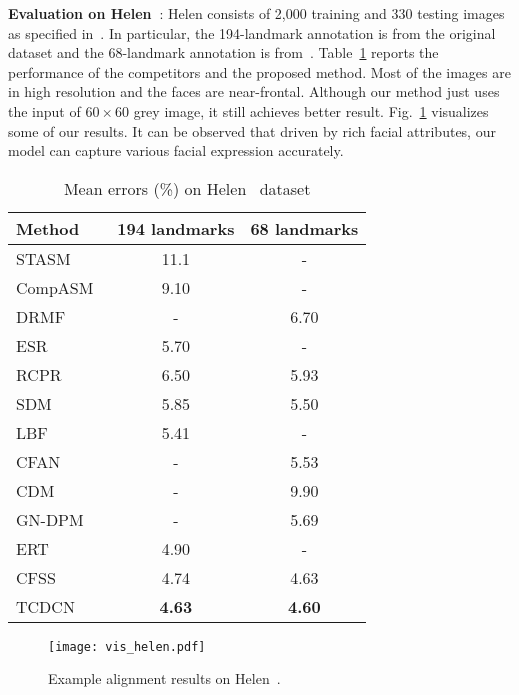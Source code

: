 \documentclass[10pt,journal,compsoc]{IEEEtran}
\begin{document}
\vspace{0.1cm}
\noindent\textbf{Evaluation on Helen~\cite{Helen}}: Helen consists of 2,000 training and 330 testing images as specified in~\cite{Helen}. In particular, the 194-landmark annotation is from the original dataset and the 68-landmark annotation is from~\cite{300w}. Table~\ref{tab:helen} reports the performance of the competitors and the proposed method. Most of the images are in high resolution and the faces are near-frontal. Although our method just uses the input of $60\times60$ grey image, it still achieves better result. Fig.~\ref{fig:visual_examples_helen} visualizes some of our results. It can be observed that driven by rich facial attributes, our model can capture various facial expression accurately.

\begin{table}[t]
\caption{Mean errors (\%) on Helen~\cite{Helen} dataset}
\vskip -0.5cm
\label{tab:helen}

\begin{center}
\begin{tabular}{l|c|c}
\hline
Method&194 landmarks&68 landmarks\\
\hline\hline
STASM~\cite{milborrow2008locating}&11.1&-\\
CompASM~\cite{Helen}&9.10&-\\
DRMF~\cite{asthana2013robust}&-&6.70\\
ESR~\cite{Cao2012}&5.70&-\\
RCPR~\cite{dollar13}&6.50&5.93\\
SDM~\cite{6618919}&5.85&5.50\\
LBF~\cite{300w_lbp}&5.41&-\\
CFAN~\cite{zhang2014coarse}&-&5.53\\
CDM~\cite{Yu2013}&-&9.90\\
GN-DPM~\cite{tzimiropoulos2014gauss}&-&5.69\\
ERT~\cite{kazemi2014one}&4.90&-\\
CFSS~\cite{zhu2015face}&4.74&4.63\\
TCDCN&\textbf{4.63}&\textbf{4.60}\\
\hline
\end{tabular}
\end{center}
\end{table}

\begin{figure}[t]
  \centering
  \texttt{[image: vis\_helen.pdf]}
  \vskip -0.3cm
  \caption{Example alignment results on Helen~\cite{Helen}.}
  \label{fig:visual_examples_helen}
  \vskip -0.3cm
\end{figure}
\end{document}

